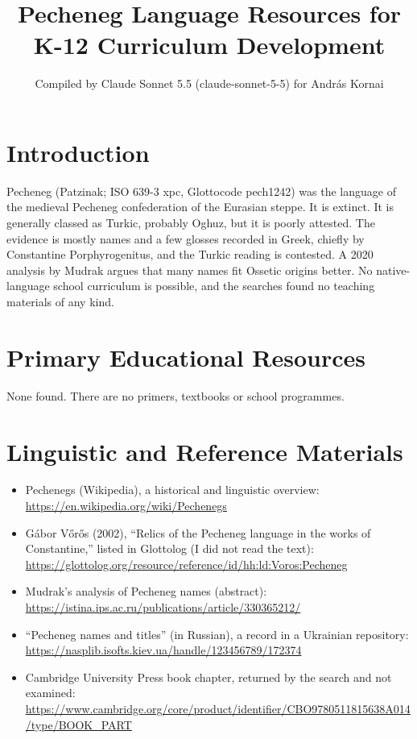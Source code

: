 \documentclass[12pt]{article}
\title{Pecheneg Language Resources for K-12 Curriculum Development}
\author{Compiled by Claude Sonnet 5.5 (claude-sonnet-5-5) for Andr\'as Kornai}
\date{}
\begin{document}
\maketitle

\section{Introduction}
Pecheneg (Patzinak; ISO 639-3 xpc, Glottocode pech1242) was the language of the medieval Pecheneg confederation of the Eurasian steppe. It is extinct. It is generally classed as Turkic, probably Oghuz, but it is poorly attested. The evidence is mostly names and a few glosses recorded in Greek, chiefly by Constantine Porphyrogenitus, and the Turkic reading is contested. A 2020 analysis by Mudrak argues that many names fit Ossetic origins better. No native-language school curriculum is possible, and the searches found no teaching materials of any kind.

\section{Primary Educational Resources}
None found. There are no primers, textbooks or school programmes.

\section{Linguistic and Reference Materials}
\begin{itemize}
\item Pechenegs (Wikipedia), a historical and linguistic overview: \url{https://en.wikipedia.org/wiki/Pechenegs}
\item Gábor Vőrős (2002), ``Relics of the Pecheneg language in the works of Constantine,'' listed in Glottolog (I did not read the text): \url{https://glottolog.org/resource/reference/id/hh:ld:Voros:Pecheneg}
\item Mudrak's analysis of Pecheneg names (abstract): \url{https://istina.ips.ac.ru/publications/article/330365212/}
\item ``Pecheneg names and titles'' (in Russian), a record in a Ukrainian repository: \url{https://nasplib.isofts.kiev.ua/handle/123456789/172374}
\item Cambridge University Press book chapter, returned by the search and not examined: \url{https://www.cambridge.org/core/product/identifier/CBO9780511815638A014/type/BOOK_PART}
\end{itemize}
\end{document}
